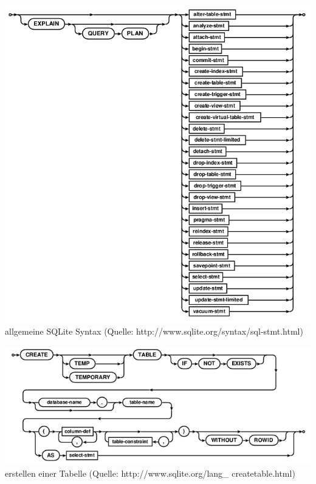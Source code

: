 \documentclass[12pt,a4paper]{report}
\begin{document}
\begin{onehalfspace}
\begin{center}
\includegraphics[scale=0.8]{img/sqlite_syntax.png}\\
allgemeine SQLite Syntax (Quelle: http://www.sqlite.org/syntax/sql-stmt.html)
\end{center}

\begin{center}
\includegraphics[scale=0.8]{img/sqlite_create.png}\\
erstellen einer Tabelle (Quelle: http://www.sqlite.org/lang\_ createtable.html)
\end{center}


\end{onehalfspace}
\end{document}
